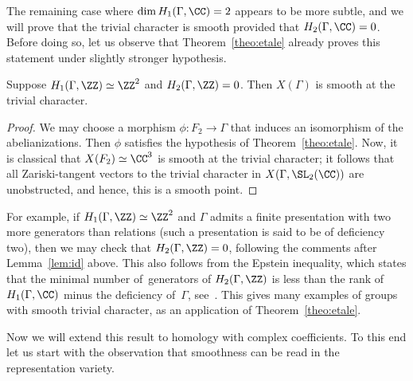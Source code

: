 The remaining case where $\dim H_1(\Gamma,\CC)=2$ appears to be more subtle,
and we will prove that the trivial character is smooth provided that
$H_2(\Gamma,\CC)=0$. Before doing so, let us observe that
Theorem~\ref{theo:etale} already proves this statement under slightly
stronger hypothesis.
\begin{lemma}
Suppose $H_1(\Gamma,\ZZ)\simeq\ZZ^2$ and $H_2(\Gamma,\ZZ)=0$.
Then $X(\Gamma)$ is smooth at the trivial character.
\end{lemma}
\begin{proof}
We may choose a morphism $\phi\colon F_2\to\Gamma$ that induces an
isomorphism of the abelianizations. Then $\phi$ satisfies the hypothesis
of Theorem~\ref{theo:etale}. Now, it is classical that $X(F_2)\simeq\CC^3$
is smooth at the trivial character; it follows that all Zariski-tangent
vectors to the trivial character in $X(\Gamma,\SL_2(\CC))$ are unobstructed,
and hence, this is a smooth point.
\end{proof}
For example, if $H_1(\Gamma,\ZZ)\simeq\ZZ^2$ and $\Gamma$ admits a finite
presentation with two more generators than relations (such a presentation
is said to be of deficiency two), then we may check that $H_2(\Gamma,\ZZ)=0$,
following the comments after Lemma~\ref{lem:id} above.
This also follows from the Epstein inequality, which
states
that the minimal \hbox{number} of~\hbox{generators} of $H_2(\Gamma,\ZZ)$ is less than the
rank of $H_1(\Gamma,\CC)$ minus the deficiency of~$\Gamma$, see~\cite{Epstein}.
This gives many examples of groups with smooth trivial character, as an
application of Theorem~\ref{theo:etale}.

Now we will extend this result to homology with complex coefficients. To this
end let us start with the observation that smoothness can be read in the
representation variety.

